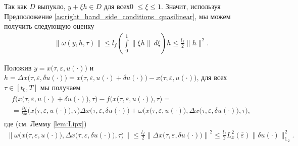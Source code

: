 \documentclass[../main.tex]{subfiles}
\begin{document}
Так как $D$ выпукло, $ y + \xi h \in D$ для всех0 $\leqslant \xi \leqslant 1$.
Значит, используя Предположение \ref{as:right_hand_side_conditions_quasilinear},  мы можем получить следующую оценку
\begin{gather*}
    \|\omega(y,h,\tau)\| \leqslant l_f \left( \int\limits_0^1  \left\| \xi h \right\| \ d\xi \right)h  \leqslant \frac{l_f}{2} \|h\|^2.
\end{gather*}

Положив $y = x\big(\tau,\varepsilon, u(\cdot)\big)$  и $h = \Delta x\big(\tau, \varepsilon, \delta u(\cdot)\big) = x\big(\tau,\varepsilon, u(\cdot) + \delta u(\cdot)\big) - x\big(\tau,\varepsilon, u(\cdot)\big)$, для всех $\tau \in [t_0,T]$ мы получаем
\begin{gather}\label{mean-value}
    \begin{gathered}
        f\Big(x\big(\tau,\varepsilon, u(\cdot) + \delta u(\cdot)\big),\tau\Big) -
        f\Big(x\big(\tau,\varepsilon, u(\cdot)\big),\tau\Big) = \\ = 
        \frac{\partial f}{\partial x}  \Big(x\big(\tau,\varepsilon, u(\cdot)\big), \tau\Big) 
        \Delta x\big(\tau, \varepsilon, \delta u(\cdot)\big)  + 
        \omega\Big(x\big(\tau,\varepsilon, u(\cdot)\big),\Delta x\big(\tau, \varepsilon, \delta u(\cdot)\big),\tau\Big),
    \end{gathered}
\end{gather}
где (см. Лемму \ref{lem:Lipx})
\begin{gather}\label{omega_est}
    \left\|\omega\Big(x\big(\tau,\varepsilon, u(\cdot)\big),\Delta x\big(\tau, \varepsilon, \delta u(\cdot)\big),\tau\Big)\right\| 
    \leqslant
    \frac{l_f}{2} \left\|\Delta x\big(\tau, \varepsilon, \delta u(\cdot)\big)\right\|^2 
    \leqslant
    \frac{l_f}{2} L_x^2(\overline{\varepsilon}) \|\delta u(\cdot)\|_{\mathbb{L}_2}^2.
\end{gather}
\end{document}
